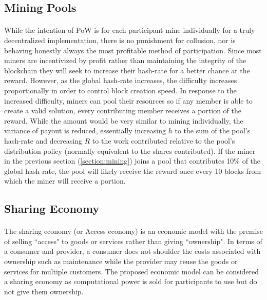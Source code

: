 \subsection{Mining Pools}

\paragraph{} While the intention of PoW is for each participant mine individually for a truly decentralized implementation, there is no punishment for collusion, nor is behaving honestly always the most profitable method of participation. Since most miners are incentivized by profit rather than maintaining the integrity of the blockchain they will seek to increase their hash-rate for a better chance at the reward. However, as the global hash-rate increases, the difficulty increases proportionally in order to control block creation speed. In response to the increased difficulty, miners can pool their resources so if any member is able to create a valid solution, every contributing member receives a portion of the reward. While the amount would be very similar to mining individually, the variance of payout is reduced, essentially increasing $h$ to the sum of the pool's hash-rate and decreasing $R$ to the work contributed relative to the pool's distribution policy (normally equivalent to the shares contributed). If the miner in the previous section (\ref{section:mining}) joins a pool that contributes 10\% of the global hash-rate, the pool will likely receive the reward once every 10 blocks from which the miner will receive a portion.

\subsection{Sharing Economy} \label{section:sharingeconomy}

\paragraph{} The sharing economy (or Access economy) is an economic model with the premise of selling ``access" to goods or services rather than giving ``ownership". In terms of a consumer and provider, a consumer does not shoulder the costs associated with ownership such as maintenance while the provider may reuse the goods or services for multiple customers. The proposed economic model can be considered a sharing economy as computational power is sold for participants to use but do not give them ownership.

